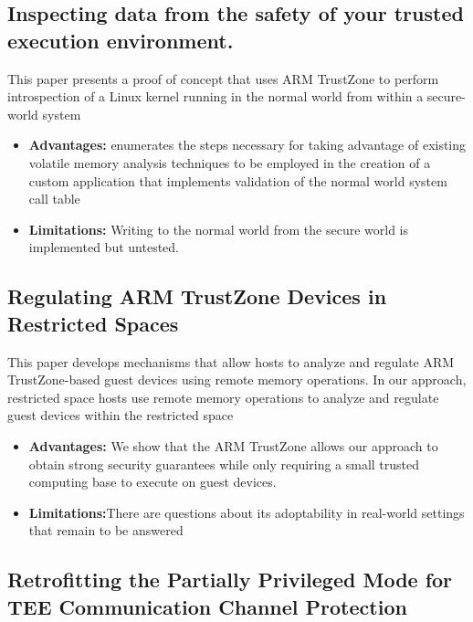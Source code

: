 \documentclass[conference]{IEEEtran}
\begin{document}
\subsection{Inspecting data from the safety of your trusted execution environment.}

This paper presents a proof of concept that uses ARM TrustZone to perform introspection of a Linux kernel running in the normal world from within a secure-world system
\begin{itemize}
    \item \textbf{Advantages:} enumerates the steps necessary for taking advantage of existing volatile memory analysis techniques to be employed in the creation of a custom application that implements validation of the normal world system call table
    \item \textbf{Limitations:} Writing to the normal world from the secure world is implemented but untested.
\end{itemize}


\subsection{Regulating ARM TrustZone Devices in Restricted Spaces}

This paper develops mechanisms that allow hosts to analyze and regulate ARM TrustZone-based guest devices using remote memory operations.  In our approach, restricted space hosts use remote memory operations to analyze and regulate guest devices within the restricted space
\begin{itemize}
    \item \textbf{Advantages:} We show that the ARM TrustZone allows our approach to obtain strong security guarantees while only requiring a small trusted computing base to execute on guest devices.
    \item \textbf{Limitations:}There are questions about its adoptability in real-world settings that remain to be answered
\end{itemize}


\subsection{Retrofitting the Partially Privileged Mode for TEE Communication Channel Protection}
\end{document}
